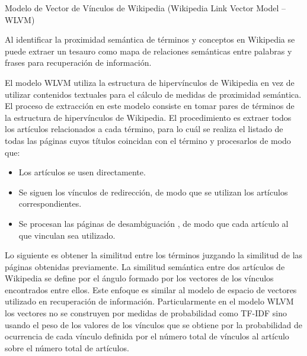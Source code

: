 \documentclass[letterpaper]{article}
\newcommand\liststyleLxiv{%
\renewcommand\labelitemi{{\textbullet}}
\renewcommand\labelitemii{${\circ}$}
\renewcommand\labelitemiii{${\blacksquare}$}
\renewcommand\labelitemiv{{\textbullet}}
}
\begin{document}
{\sffamily
Modelo de Vector de V\'inculos de Wikipedia (Wikipedia Link Vector Model
-- WLVM)}


\bigskip

{\sffamily
Al identificar la proximidad sem\'antica de t\'erminos y conceptos en
Wikipedia se puede extraer un tesauro como mapa de relaciones
sem\'anticas entre palabras y frases para recuperaci\'on de
informaci\'on.}


\bigskip

{\sffamily
El modelo WLVM utiliza la estructura de hiperv\'inculos de Wikipedia en
vez de utilizar contenidos textuales para el c\'alculo de medidas de
proximidad sem\'antica. El proceso de extracci\'on en este modelo
consiste en tomar pares de t\'erminos de la estructura de
hiperv\'inculos de Wikipedia. El procedimiento es extraer todos los
art\'iculos relacionados a cada t\'ermino, para lo cu\'al se realiza el
listado de todas las p\'aginas cuyos t\'itulos coincidan con el
t\'ermino y procesarlos de modo que:}


\bigskip

\liststyleLxiv
\begin{itemize}
\item {\sffamily
Los art\'iculos se usen directamente.}
\item {\sffamily
Se siguen los v\'inculos de redirecci\'on, de modo que se utilizan los
art\'iculos correspondientes.}
\item {\sffamily
Se procesan las p\'aginas de desambiguaci\'on%
, de modo que cada art\'iculo al que vinculan sea utilizado.}
\end{itemize}

\bigskip

{\sffamily
Lo siguiente es obtener la similitud entre los t\'erminos juzgando la
similitud de las p\'aginas obtenidas previamente. La similitud
sem\'antica entre dos art\'iculos de Wikipedia se define por el
\'angulo formado por los vectores de los v\'inculos encontrados entre
ellos. Este enfoque es similar al modelo de espacio de vectores%
 utilizado en recuperaci\'on de informaci\'on. Particularmente en el
modelo WLVM los vectores no se construyen por medidas de probabilidad
como TF-IDF sino usando el peso de los valores de los v\'inculos que se
obtiene por la probabilidad de ocurrencia de cada v\'inculo definida
por el n\'umero total de v\'inculos al art\'iculo sobre el n\'umero
total de art\'iculos.}
\end{document}
